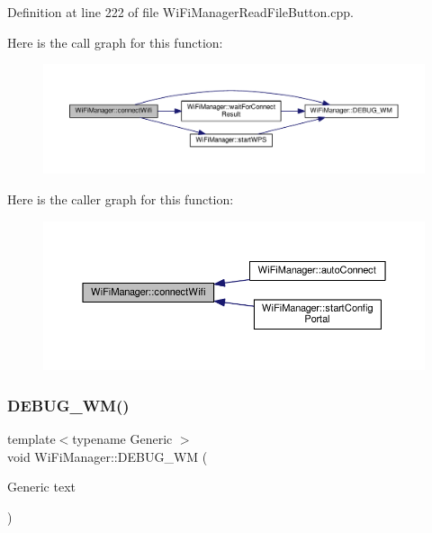 Definition at line 222 of file Wi\+Fi\+Manager\+Read\+File\+Button.\+cpp.

Here is the call graph for this function\+:\nopagebreak
\begin{figure}[H]
\begin{center}
\leavevmode
\includegraphics[width=350pt]{class_wi_fi_manager_ae0ae27b5543b47585728c084c3bbdca7_cgraph}
\end{center}
\end{figure}
Here is the caller graph for this function\+:\nopagebreak
\begin{figure}[H]
\begin{center}
\leavevmode
\includegraphics[width=350pt]{class_wi_fi_manager_ae0ae27b5543b47585728c084c3bbdca7_icgraph}
\end{center}
\end{figure}
\mbox{\label{class_wi_fi_manager_ae5f595c670ccbcf9a191baf50f5c7c26}} 
\subsubsection{\texorpdfstring{D\+E\+B\+U\+G\+\_\+\+W\+M()}{DEBUG\_WM()}}
{\footnotesize\ttfamily template$<$typename Generic $>$ \\
void Wi\+Fi\+Manager\+::\+D\+E\+B\+U\+G\+\_\+\+WM (\begin{DoxyParamCaption}\item[{Generic}]{text }\end{DoxyParamCaption})\hspace{0.3cm}{\ttfamily [private]}}



